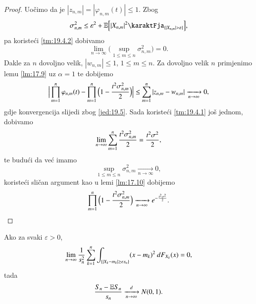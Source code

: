 \begin{proof}
    Uo\v cimo da je $|z_{n, m}| = |\varphi_{n, m} (t)| \leq 1$.
    Zbog
    \begin{equation*}
        \sigma_{n, m}^2 \leq \varepsilon^2 + \masE \Big[ |X_{n, m}|^2 \karaktFja_{\{ |X_{n, m}| > \varepsilon \}} \Big],    
    \end{equation*}
    pa koriste\' ci \ref{tm:19.4.2} dobivamo
    \begin{equation*}
        \lim\limits_{n \to \infty} \big( \sup\limits_{1 \leq m \leq n} \sigma_{n, m}^2 \big) = 0.
    \end{equation*}
    Dakle za $n$ dovoljno velik, $|w_{n, m}| \leq 1$, $1 \leq m \leq n$.
    Za dovoljno velik $n$ primjenimo lemu \ref{lm:17.9} uz $\alpha = 1$ te dobijemo
    \begin{equation*}
        \Big| \prod\limits_{m = 1}^{n} \varphi_{n, m} (t) - \prod\limits_{m = 1}^{n} \Big( 1 - \frac{t^2 \sigma_{n, m}^2}{2} \Big) \Big| \leq \sum\limits_{m = 1}^{n} |z_{n, m} - w_{n, m}| \xrightarrow[n \to \infty]{} 0,
    \end{equation*}
    gdje konvergencija slijedi zbog \eqref{jed:19.5}.
    Sada koriste\' ci \ref{tm:19.4.1} jo\v s jednom, dobivamo
    \begin{equation*}
        \lim\limits_{n \to \infty} \sum\limits_{m = 1}^{n} \frac{t^2 \sigma_{n, m}^2}{2} = \frac{t^2 \sigma^2}{2},
    \end{equation*}
    te budu\' ci da ve\' c imamo
    \begin{equation*}
        \sup\limits_{1 \leq m \leq n} \sigma_{n, m}^2 \xrightarrow[n \to \infty]{} 0,    
    \end{equation*}
    koriste\' ci sli\v can argument kao u lemi \ref{lm:17.10} dobijemo
    \begin{equation*}
        \prod\limits_{m = 1}^{n} \Big( 1 - \frac{t^2 \sigma_{n, m}^2}{2} \Big) \xrightarrow[n \to \infty]{} e^{- \frac{t^2 \sigma^2}{2}}.
    \end{equation*}
\end{proof}

\begin{kor}  \label{kor:19.6}
    \quad \newline
    Ako za svaki $\varepsilon > 0$,
    \begin{equation}    \label{jed:19.7}
        \lim\limits_{n \to \infty} \frac{1}{s_n^2} \sum\limits_{k = 1}^{n} \int_{\{|X_k - m_k| \geq \varepsilon s_n\}} (x - m_k)^2 \: d F_{X_k} (x) = 0,
    \end{equation}
    tada
    \begin{equation*}
        \frac{S_n - \mathbb{E} S_n}{s_n} \xrightarrow[n \to \infty]{d} N(0,1).
    \end{equation*}
\end{kor}

